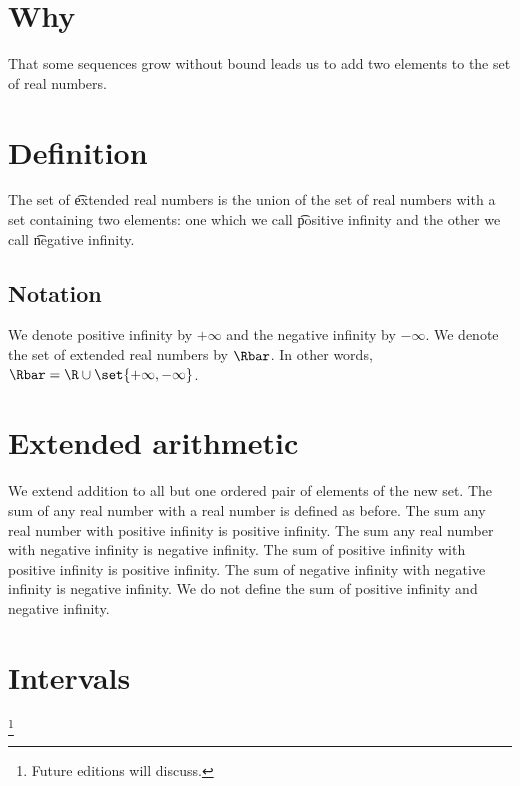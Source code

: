 
\section*{Why}

That some sequences grow without bound leads us to add two elements to the set of real numbers.

\section*{Definition}

The set of \t{extended real numbers} is the union of the set of real numbers with a set containing two elements: one which we call \t{positive infinity} and the other we call \t{negative infinity}.

\subsection*{Notation}

We denote positive infinity by $+\infty$ and the negative infinity by $-\infty$.
We denote the set of extended real numbers by $\Rbar$.
In other words, $\Rbar = \R  \cup \set{+\infty,-\infty}$.

\section*{Extended arithmetic}

We extend addition to all but one ordered pair of elements of the new set.
The sum of any real number with a real number is defined as before.
The sum any real number with positive infinity is positive infinity.
The sum any real number with negative infinity is negative infinity.
The sum of positive infinity with positive infinity is positive infinity.
The sum of negative infinity with negative infinity is negative infinity.
We do not define the sum of positive infinity and negative infinity.

\section*{Intervals}
\footnote{Future editions will discuss.}
\blankpage